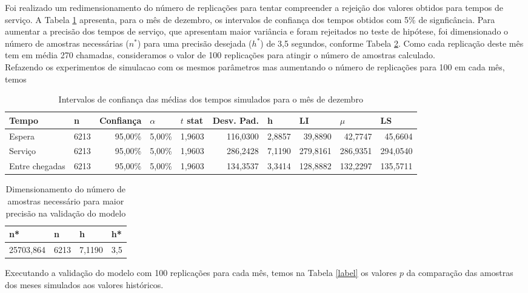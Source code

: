     
Foi realizado um redimensionamento do número de replicações para tentar compreender a rejeição dos valores obtidos para tempos de serviço. A Tabela \ref*{fig: intervalo-confianca} apresenta, para o mês de dezembro, os intervalos de confiança dos tempos obtidos com 5\% de signficância. Para aumentar a precisão dos tempos de serviço, que apresentam maior variância e foram rejeitados no teste de hipótese, foi dimensionado o número de amostras necessárias ($n^*$) para uma precisão desejada ($h^*$) de 3,5 segundos, conforme Tabela \ref*{fig: dimensionamento-corridas}. Como cada replicação deste mês tem em média 270 chamadas, consideramos o valor de 100 replicações para atingir o número de amostras calculado.\\
Refazendo os experimentos de simulacao com os mesmos parâmetros mas aumentando o número de replicações para 100 em cada mês, temos 

\begin{table}[H]
    \begin{tabular}{|l|r|r|r|r|r|r|r|r|r|}
    \hline
    Tempo & \multicolumn{1}{l|}{n} & \multicolumn{1}{l|}{Confiança} & \multicolumn{1}{l|}{$\alpha$} & \multicolumn{1}{l|}{$t$ stat} & \multicolumn{1}{l|}{Desv. Pad.} & \multicolumn{1}{l|}{h} & \multicolumn{1}{l|}{LI} & \multicolumn{1}{l|}{$\mu$} & \multicolumn{1}{l|}{LS} \\ \hline
    Espera & 6213 & 95,00\% & 5,00\% & 1,9603 & 116,0300 & 2,8857 & 39,8890 & 42,7747 & 45,6604 \\ \hline
    Serviço & 6213 & 95,00\% & 5,00\% & 1,9603 & 286,2428 & 7,1190 & 279,8161 & 286,9351 & 294,0540 \\ \hline
    Entre chegadas & 6213 & 95,00\% & 5,00\% & 1,9603 & 134,3537 & 3,3414 & 128,8882 & 132,2297 & 135,5711 \\ \hline
    \end{tabular}
    \caption{Intervalos de confiança das médias dos tempos simulados para o mês de dezembro}
    \label{fig: intervalo-confianca}
\end{table}

\begin{table}[H]
    \centering
    \begin{tabular}{|l|l|l|l|}
    \hline
    n* & n & h & h* \\ \hline
    \multicolumn{1}{|r|}{25703,864} & \multicolumn{1}{r|}{6213} & \multicolumn{1}{r|}{7,1190} & \multicolumn{1}{r|}{3,5} \\ \hline
    \end{tabular}
    \caption{Dimensionamento do número de amostras necessário para maior precisão na validação do modelo}
    \label{fig: dimensionamento-corridas}
\end{table}
    
Executando a validação do modelo com 100 replicações para cada mês, temos na Tabela \ref*{label} os valores $p$ da comparação das amostras dos meses simulados aos valores históricos.



